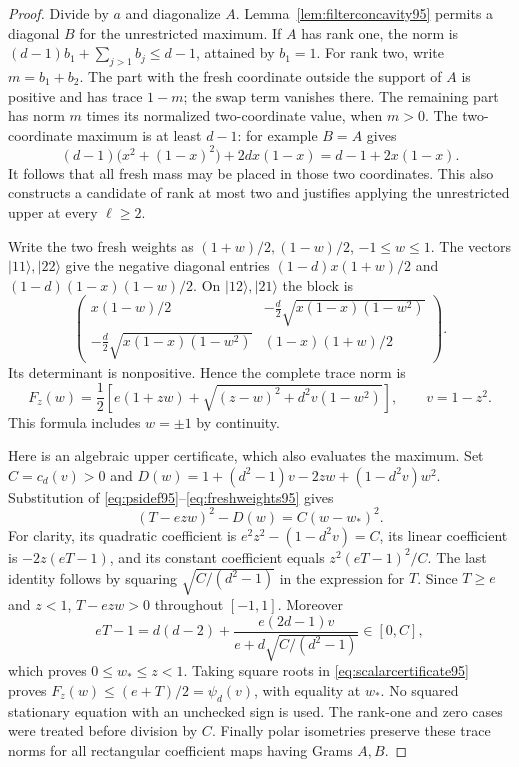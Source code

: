 \begin{proof}
Divide by $a$ and diagonalize $A$.
Lemma~\ref{lem:filterconcavity95} permits a diagonal $B$ for the
unrestricted maximum.  If $A$ has rank one, the norm is
$(d-1)b_1+\sum_{j>1}b_j\le d-1$, attained by $b_1=1$.
For rank two, write $m=b_1+b_2$.  The part with the fresh coordinate
outside the support of $A$ is positive and has trace $1-m$;
the swap term vanishes there.  The remaining part has norm $m$
times its normalized two-coordinate value, when $m>0$.
The two-coordinate maximum is at least $d-1$: for example $B=A$
gives
\[
 (d-1)\bigl(x^2+(1-x)^2\bigr)+2d x(1-x)
                   =d-1+2x(1-x).
\]
It follows that all fresh mass may be placed in those two coordinates.
This also constructs a candidate of rank at most two and justifies
applying the unrestricted upper at every $\ell\ge2$.

Write the two fresh weights as $(1+w)/2,(1-w)/2$, $-1\le w\le1$.
The vectors $|11\rangle,|22\rangle$ give the negative diagonal
entries $(1-d)x(1+w)/2$ and $(1-d)(1-x)(1-w)/2$.
On $|12\rangle,|21\rangle$ the block is
\[
 \begin{pmatrix}
 x(1-w)/2&-\tfrac d2\sqrt{x(1-x)(1-w^2)}\\
 -\tfrac d2\sqrt{x(1-x)(1-w^2)}&(1-x)(1+w)/2
 \end{pmatrix}.
\]
Its determinant is nonpositive.  Hence the complete trace norm is
\begin{equation}\label{eq:scalarleaf95}
 F_z(w)=\frac12\left[e(1+zw)+
       \sqrt{(z-w)^2+d^2v(1-w^2)}\right],\qquad v=1-z^2.
\end{equation}
This formula includes $w=\pm1$ by continuity.

Here is an algebraic upper certificate, which also evaluates the
maximum.  Set $C=c_d(v)>0$ and
$D(w)=1+(d^2-1)v-2zw+(1-d^2v)w^2$.
Substitution of \eqref{eq:psidef95}--\eqref{eq:freshweights95} gives
\begin{equation}\label{eq:scalarcertificate95}
 (T-ezw)^2-D(w)=C(w-w_*)^2.
\end{equation}
For clarity, its quadratic coefficient is
$e^2z^2-(1-d^2v)=C$, its linear coefficient is
$-2z(eT-1)$, and its constant coefficient equals
$z^2(eT-1)^2/C$.  The last identity follows by squaring
$\sqrt{C/(d^2-1)}$ in the expression for $T$.
Since $T\ge e$ and $z<1$, $T-ezw>0$ throughout $[-1,1]$.
Moreover
\[
 eT-1=d(d-2)+
     \frac{e(2d-1)v}{e+d\sqrt{C/(d^2-1)}}\in[0,C],
\]
which proves $0\le w_*\le z<1$.
Taking square roots in \eqref{eq:scalarcertificate95} proves
$F_z(w)\le(e+T)/2=\psi_d(v)$, with equality at $w_*$.
No squared stationary equation with an unchecked sign is used.
The rank-one and zero cases were treated before division by $C$.
Finally polar isometries preserve these trace norms for all rectangular
coefficient maps having Grams $A,B$.
\end{proof}

